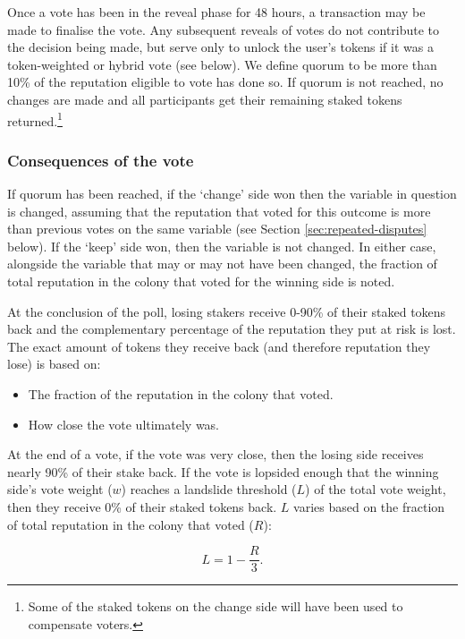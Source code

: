 Once a vote has been in the reveal phase for 48 hours, a transaction may be made to finalise the vote. Any subsequent reveals of votes do not contribute to the decision being made, but serve only to unlock the user's tokens if it was a token-weighted or hybrid vote (see below). We define quorum to be more than 10\% of the reputation eligible to vote has done so. If quorum is not reached, no changes are made and all participants get their remaining staked tokens returned.\footnote{Some of the staked tokens on the change side will have been used to compensate voters.}

\subsubsection{Consequences of the vote}
If quorum has been reached, if the `change' side won then the variable in question is changed, assuming that the reputation that voted for this outcome is more than previous votes on the same variable (see Section \ref{sec:repeated-disputes} below). If the `keep' side won, then the variable is not changed. In either case, alongside the variable that may or may not have been changed, the fraction of total reputation in the colony that voted for the winning side is noted. 

At the conclusion of the poll, losing stakers receive 0-90\% of their staked tokens back and the complementary percentage of the reputation they put at risk is lost. The exact amount of tokens they receive back (and therefore reputation they lose) is based on:

\begin{itemize}
 \item The fraction of the reputation in the colony that voted.
 \item How close the vote ultimately was.
\end{itemize}

At the end of a vote, if the vote was very close, then the losing side receives nearly 90\% of their stake back. If the vote is lopsided enough that the winning side's vote weight ($w$) reaches a landslide threshold ($L$) of the total vote weight, then they receive 0\% of their staked tokens back. $L$ varies based on the fraction of total reputation in the colony that voted ($R$):

\begin{equation}
L = 1 - \frac{R}{3}.
\end{equation}

